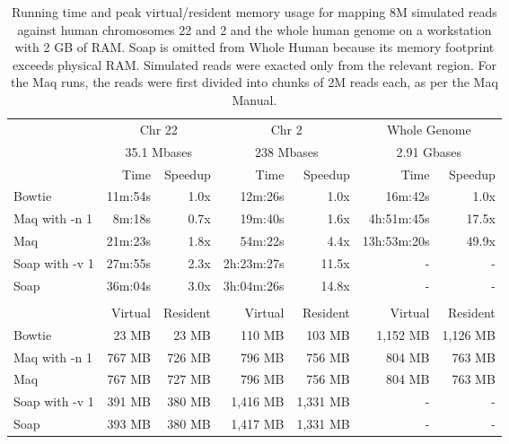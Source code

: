 \documentclass[letterpaper]{article}
\begin{document}
\begin{table}[tp]
\scriptsize
\begin{tabular}{lrrrrrr}
\toprule
 & \multicolumn{2}{c}{Chr 22} & \multicolumn{2}{c}{Chr 2} & \multicolumn{2}{c}{Whole Genome} \\[3pt] 
 & \multicolumn{2}{c}{35.1 Mbases} & \multicolumn{2}{c}{238 Mbases} & \multicolumn{2}{c}{2.91 Gbases} \\[3pt] 
 & Time & Speedup & Time & Speedup & Time & Speedup \\ 
\toprule
Bowtie & 11m:54s & 1.0x & 12m:26s & 1.0x & 16m:42s & 1.0x  \\ \midrule 
Maq with -n 1 & 8m:18s & 0.7x & 19m:40s & 1.6x & 4h:51m:45s & 17.5x  \\ \midrule 
Maq & 21m:23s & 1.8x & 54m:22s & 4.4x & 13h:53m:20s & 49.9x  \\ \midrule 
Soap with -v 1 & 27m:55s & 2.3x & 2h:23m:27s & 11.5x & - & -  \\ \midrule 
Soap & 36m:04s & 3.0x & 3h:04m:26s & 14.8x & - & -  \\[2pt] \bottomrule \\ 
 & Virtual & Resident & Virtual & Resident & Virtual & Resident \\ 
\toprule
Bowtie & 23 MB & 23 MB & 110 MB & 103 MB & 1,152 MB & 1,126 MB  \\ \midrule 
Maq with -n 1 & 767 MB & 726 MB & 796 MB & 756 MB & 804 MB & 763 MB  \\ \midrule 
Maq & 767 MB & 727 MB & 796 MB & 756 MB & 804 MB & 763 MB  \\ \midrule 
Soap with -v 1 & 391 MB & 380 MB & 1,416 MB & 1,331 MB & - & -  \\ \midrule 
Soap & 393 MB & 380 MB & 1,417 MB & 1,331 MB & - & -  \\ 
\bottomrule
\end{tabular}
\scriptsize\caption{Running time and peak virtual/resident memory usage for mapping 8M simulated reads against human chromosomes 22 and 2 and the whole human genome on a workstation with 2 GB of RAM.  Soap is omitted from Whole Human because its memory footprint exceeds physical RAM.  Simulated reads were exacted only from the relevant region.  For the Maq runs, the reads were first divided into chunks of 2M reads each, as per the Maq Manual.}
\end{table}
\end{document}
